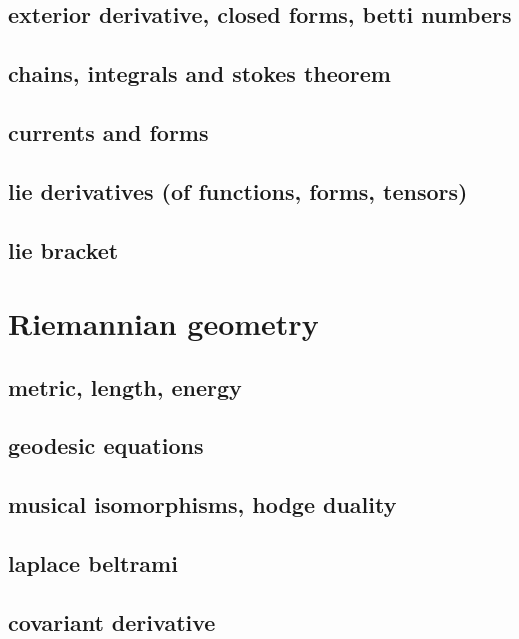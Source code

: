 \subsection{exterior derivative, closed forms, betti numbers}

\subsection{chains, integrals and stokes theorem}

\subsection{currents and forms}

\subsection{lie derivatives (of functions, forms, tensors)}

\subsection{lie bracket}


\clearpage
\section{Riemannian geometry}


\subsection{metric, length, energy}

\subsection{geodesic equations}

\subsection{musical isomorphisms, hodge duality}

\subsection{laplace beltrami}

\subsection{covariant derivative}

